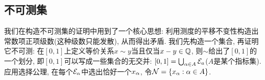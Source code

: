 


\subsection{不可测集}
我们在构造不可测集的证明中用到了一个核心思想: 利用测度的平移不变性构造出常数项正项级数(这种级数只能发散), 从而得出矛盾. 
我们先构造一个集合, 再证明它不可测:
在$[0,1]$上定义等价关系$x \sim y$当且仅当$x-y \in \mathbb{Q}$,
则$\sim$给出了$[0,1]$的一个划分, 即$[0,1]$可以写成一些集合的无交并:
$[0,1]=\bigcup_{\alpha \in A} \mathcal{E}_a$($A$是某个指标集). 应用选择公理, 在每个$\mathcal{E}_\alpha$中选出恰好一个$x_\alpha$, 令$\mathcal{N} = \{x_\alpha: \alpha \in A\}$.

